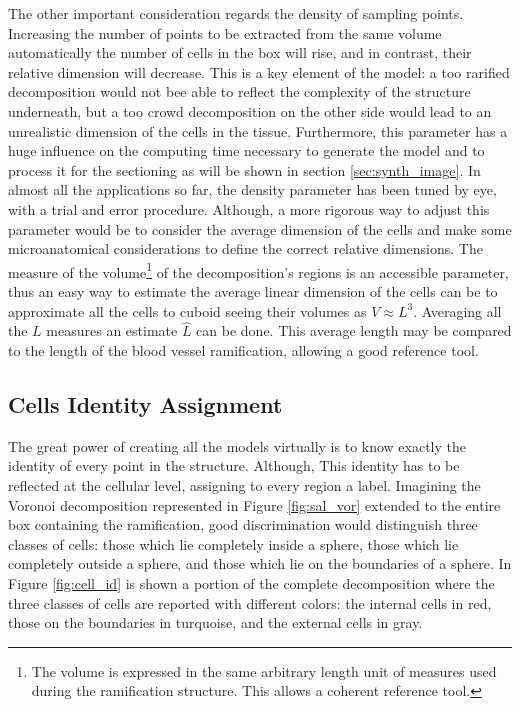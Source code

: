 \documentclass[12pt,a4paper]{report}
\begin{document}
    The other important consideration regards the density of sampling points. Increasing the number of points to be extracted from the same volume automatically the number of cells in the box will rise, and in contrast, their relative dimension will decrease. This is a key element of the model: a too rarified decomposition would not bee able to reflect the complexity of the structure underneath, but a too crowd decomposition on the other side would lead to an unrealistic dimension of the cells in the tissue. Furthermore, this parameter has a huge influence on the computing time necessary to generate the model and to process it for the sectioning as will be shown in section \ref{sec:synth_image}. In almost all the applications so far, the density parameter has been tuned by eye, with a trial and error procedure. Although, a more rigorous way to adjust this parameter would be to consider the average dimension of the cells and make some microanatomical considerations to define the correct relative dimensions. The measure of the volume\footnote{The volume is expressed in the same arbitrary length unit of measures used during the ramification structure. This allows a coherent reference tool.} of the decomposition's regions is an accessible parameter, thus an easy way to estimate the average linear dimension of the cells can be to approximate all the cells to cuboid seeing their volumes as $V \approx L^3$. Averaging all the $L$ measures an estimate $\hat{L}$ can be done. This average length may be compared to the length of the blood vessel ramification, allowing a good reference tool.

\subsection{Cells Identity Assignment}
    The great power of creating all the models virtually is to know exactly the identity of every point in the structure. Although, This identity has to be reflected at the cellular level, assigning to every region a label. Imagining the Voronoi decomposition represented in Figure  \ref{fig:sal_vor} extended to the entire box containing the ramification, good discrimination would distinguish three classes of cells: those which lie completely inside a sphere, those which lie completely outside a sphere, and those which lie on the boundaries of a sphere. In Figure \ref{fig:cell_id} is shown a portion of the complete decomposition where the three classes of cells are reported with different colors: the internal cells in red, those on the boundaries in turquoise, and the external cells in gray.
\end{document}

